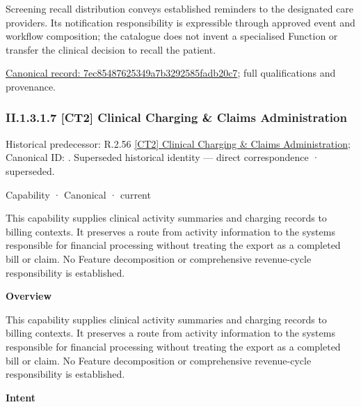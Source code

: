 Screening recall distribution conveys established reminders to the designated care providers. Its notification responsibility is expressible through approved event and workflow composition; the catalogue does not invent a specialised Function or transfer the clinical decision to recall the patient.


{\footnotesize \href{../../../../continuum/strategy/capability/feature/7ec85487625349a7b3292585fadb20c7.md}{Canonical record: 7ec85487625349a7b3292585fadb20c7}; full qualifications and provenance.}\par
\subsubsection*{II.1.3.1.7 [CT2] Clinical Charging \& Claims Administration}
\label{navigation:II.1.3.1.7}

{\small Historical predecessor: R.2.56 \hyperref[element:44433108cc8f4f5f9d7581f9e5b29eb5]{[CT2] Clinical Charging \& Claims Administration}; Canonical ID: \texttt{}. Superseded historical identity — direct correspondence · superseded.}\par
\label{element:af78ab7c89454a608cd4d34ec7703331}
{\small Capability · Canonical · current}\par

This capability supplies clinical activity summaries and charging records to billing contexts. It preserves a route from activity information to the systems responsible for financial processing without treating the export as a completed bill or claim. No Feature decomposition or comprehensive revenue-cycle responsibility is established.



\textbf{Overview}



This capability supplies clinical activity summaries and charging records to billing contexts. It preserves a route from activity information to the systems responsible for financial processing without treating the export as a completed bill or claim. No Feature decomposition or comprehensive revenue-cycle responsibility is established.



\textbf{Intent}



